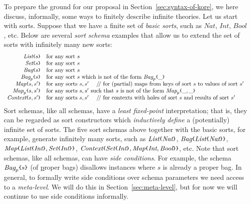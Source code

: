 \documentclass[UTF8,11pt]{article}
\theoremstyle{plain}
\theoremstyle{definition}
\theoremstyle{remark}
\newcommand{\Nat}{\textit{Nat}}
\newcommand{\Int}{\textit{Int}}
\newcommand{\Bool}{\textit{Bool}}
\newcommand{\List}{\textit{List}}
\newcommand{\Bag}{\textit{Bag}}
\newcommand{\Set}{\textit{Set}}
\newcommand{\Map}{\textit{Map}}
\newcommand{\Context}{\textit{Context}}
\newcommand{\parametric}[2]{{#1}\raisebox{.2ex}{\texttt{\footnotesize{\{}}}#2\raisebox{.2ex}{\texttt{\footnotesize{\}}}}}
\newcommand{\doubleslash}{/\!/{ }}
\begin{document}
To prepare the ground for our proposal in Section~\ref{sec:syntax-of-kore},
we here discuss, informally, some ways to finitely describe infinite theories.
Let us start with sorts.
Suppose that we have a finite set of \emph{basic sorts}, such as
$\Nat$, $\Int$, $\Bool$, etc.
Below are several \emph{sort schema} examples that allow us to extend the set
of sorts with infinitely many new sorts:
$$
\begin{array}{rl}
\parametric{\List}{s} &
\textrm{for any sort $s$} \\
\parametric{\Set}{s} &
\textrm{for any sort $s$} \\
\parametric{\Bag}{s} &
\textrm{for any sort $s$} \\
\parametric{\Bag_p}{s} &
\textrm{for any sort $s$ which is not of the form $\parametric{\Bag_p}{\_}$} \\
\parametric{\Map}{s,s'} &
\textrm{for any sorts $s,s'$ \ \ \ \doubleslash for (partial) maps from keys of 
sort 
$s$ to values of sort $s'$} \\
\parametric{\Map_p}{s,s'} &
\textrm{for any sorts $s,s'$ such that $s$ is not of the form $\parametric{\Map_p}{\_,\_}$}
\\
\parametric{\Context}{s,s'} &
\textrm{for any sorts $s,s'$ \ \ \ \doubleslash for contexts with holes of sort 
$s$ and results of sort $s'$}
\end{array}
$$
Sort schemas, like all schemas, have a \emph{least fixed-point}
interpretation;
that is, they can be regarded as sort constructors which
{\em inductively define} a (potentially) infinite set of sorts.
The five sort schemas above together with the basic sorts, for example,
generate infinitely many sorts, such as
$\parametric{\List}{\Nat}$,
$\parametric{\Bag}{\parametric{\List}{\Nat}}$,
$\parametric{\Map}{\parametric{\List}{\Int},\parametric{\Set}{\Int}}$,
$\parametric{\Context}{\parametric{\Set}{\Int},\parametric{\Map}{\Int,\Bool}}$,
etc.
Note that sort schemas, like all schemas, can have \emph{side conditions}.
For example, the schema $\parametric{\Bag_p}{s}$ (of \underline{p}roper bags)
disallows instances where $s$ is already a proper bag.
In general, to formally write side conditions over schema parameters we need
access to a \emph{meta-level}.
We will do this in Section~\ref{sec:meta-level}, but for now we will continue
to use side conditions informally.
\end{document}
